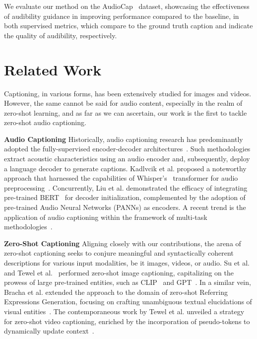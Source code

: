 \documentclass{article}
\begin{document}
We evaluate our method on the AudioCap~\cite{kim2019audiocaps} dataset, showcasing the effectiveness of audibility guidance in improving performance compared to the baseline, in both supervised metrics, which compare to the ground truth caption and indicate the quality of audibility, respectively.
\section{Related Work}

Captioning, in various forms, has been extensively studied for images and videos. However, the same cannot be said for audio content, especially in the realm of zero-shot learning, and as far as we can ascertain, our work is the first to tackle zero-shot audio captioning. 

\noindent\textbf{Audio Captioning\quad} Historically, audio captioning research has predominantly adopted the fully-supervised encoder-decoder architectures~\cite{mei2021audio, liu2022leveraging}.
Such methodologies extract acoustic characteristics using an audio encoder and, subsequently, deploy a language decoder to generate captions. Kadlvcik et al. proposed a noteworthy approach that harnessed the capabilities of Whisper's~\cite{kadlvcik2023whisper} transformer for audio preprocessing~\cite{radford2023robust}. Concurrently, Liu et al. demonstrated the efficacy of integrating pre-trained BERT~\cite{devlin2018bert} for decoder initialization, complemented by the adoption of pre-trained Audio Neural Networks (PANNs) as encoders. A recent trend is the application of audio captioning within the framework of multi-task methodologies~\cite{chen2023valor, deshmukh2023pengi}.

\noindent\textbf{Zero-Shot Captioning\quad} Aligning closely with our contributions, the arena of zero-shot captioning seeks to conjure meaningful and syntactically coherent descriptions for various input modalities, be it images, videos, or audio.
Su et al.~\cite{su2022language} and Tewel et al.~\cite{tewel2022zerocap} performed zero-shot image captioning, capitalizing on the prowess of large pre-trained entities, such as CLIP~\cite{radford2021learning} and GPT~\cite{radford2019language}. In a similar vein, Bracha et al. extended the approach to the domain of zero-shot Referring Expressions Generation, focusing on crafting unambiguous textual elucidations of visual entities~\cite{bracha2023disclip}. The contemporaneous work by Tewel et al. unveiled a strategy for zero-shot video captioning, enriched by the incorporation of pseudo-tokens to dynamically update context~\cite{tewel2022zero}.
\end{document}
